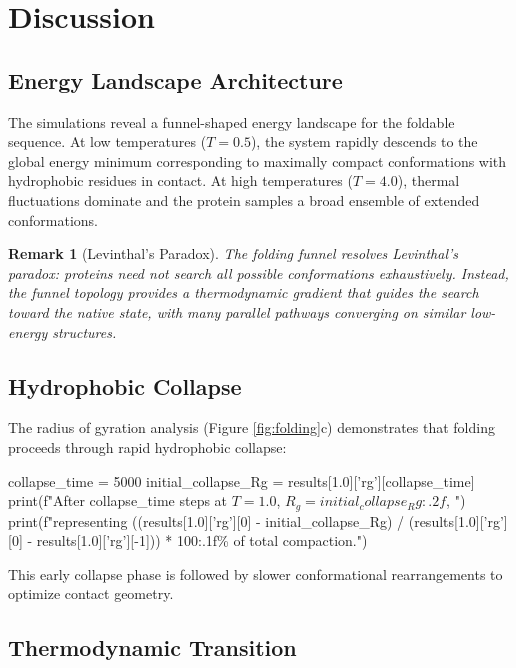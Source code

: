 \documentclass[a4paper, 11pt]{article}
\newtheorem{remark}{Remark}[section]
\begin{document}
\section{Discussion}

\subsection{Energy Landscape Architecture}

The simulations reveal a funnel-shaped energy landscape for the foldable sequence. At low
temperatures ($T = 0.5$), the system rapidly descends to the global energy minimum
corresponding to maximally compact conformations with hydrophobic residues in contact. At
high temperatures ($T = 4.0$), thermal fluctuations dominate and the protein samples a
broad ensemble of extended conformations.

\begin{remark}[Levinthal's Paradox]
The folding funnel resolves Levinthal's paradox: proteins need not search all possible
conformations exhaustively. Instead, the funnel topology provides a thermodynamic gradient
that guides the search toward the native state, with many parallel pathways converging
on similar low-energy structures.
\end{remark}

\subsection{Hydrophobic Collapse}

The radius of gyration analysis (Figure \ref{fig:folding}c) demonstrates that folding
proceeds through rapid hydrophobic collapse:

\begin{pycode}
collapse_time = 5000
initial_collapse_Rg = results[1.0]['rg'][collapse_time]
print(f"After {collapse_time} steps at $T=1.0$, $R_g = {initial_collapse_Rg:.2f}$, ")
print(f"representing {((results[1.0]['rg'][0] - initial_collapse_Rg) / (results[1.0]['rg'][0] - results[1.0]['rg'][-1])) * 100:.1f}\% of total compaction.")
\end{pycode}

This early collapse phase is followed by slower conformational rearrangements to optimize
contact geometry.

\subsection{Thermodynamic Transition}
\end{document}
